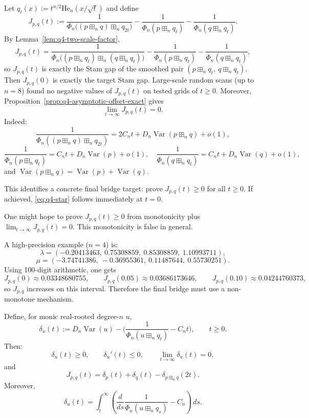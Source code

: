 \begin{remark}
Let $q_t(x):=t^{n/2}\mathrm{He}_n(x/\sqrt t)$ and define
\[
J_{p,q}(t):=
\frac1{\Phi_n\!\big((p\boxplus_n q)\boxplus_n q_{2t}\big)}
-\frac1{\Phi_n(p\boxplus_n q_t)}
-\frac1{\Phi_n(q\boxplus_n q_t)}.
\]
By Lemma~\ref{lem:q4-two-scale-factor},
\[
J_{p,q}(t)
=
\frac1{\Phi_n\!\big((p\boxplus_n q_t)\boxplus_n(q\boxplus_n q_t)\big)}
-\frac1{\Phi_n(p\boxplus_n q_t)}
-\frac1{\Phi_n(q\boxplus_n q_t)},
\]
so $J_{p,q}(t)$ is exactly the Stam gap of the smoothed pair
$(p\boxplus_n q_t,\ q\boxplus_n q_t)$.
Then $J_{p,q}(0)$ is exactly the target Stam gap.
Large-scale random scans (up to $n=8$) found no negative
values of $J_{p,q}(t)$ on tested grids of $t\ge 0$.
Moreover, Proposition~\ref{prop:q4-asymptotic-offset-exact} gives
\[
\lim_{t\to\infty}J_{p,q}(t)=0.
\]
Indeed:
\[
\frac1{\Phi_n((p\boxplus_n q)\boxplus_n q_{2t})}
=
2C_n t + D_n\operatorname{Var}(p\boxplus_n q)+o(1),
\]
\[
\frac1{\Phi_n(p\boxplus_n q_t)}
=
C_n t + D_n\operatorname{Var}(p)+o(1),
\quad
\frac1{\Phi_n(q\boxplus_n q_t)}
=
C_n t + D_n\operatorname{Var}(q)+o(1),
\]
and $\operatorname{Var}(p\boxplus_n q)=\operatorname{Var}(p)+\operatorname{Var}(q)$.

This identifies a concrete final bridge target:
prove $J_{p,q}(t)\ge 0$ for all $t\ge 0$.
If achieved, \eqref{eq:q4-star} follows immediately at $t=0$.
\end{remark}

\begin{remark}
One might hope to prove $J_{p,q}(t)\ge 0$ from monotonicity plus
$\lim_{t\to\infty}J_{p,q}(t)=0$. This monotonicity is false in general.

A high-precision example ($n=4$) is:
\[
\lambda=(-0.20413463,\ 0.75308859,\ 0.85308859,\ 1.10993711),
\]
\[
\mu=(-3.74741386,\ -0.36955361,\ 0.11487644,\ 0.55730251).
\]
Using 100-digit arithmetic, one gets
\[
J_{p,q}(0)\approx 0.03348680755,\qquad
J_{p,q}(0.05)\approx 0.03686173646,\qquad
J_{p,q}(0.10)\approx 0.04244760373,
\]
so $J_{p,q}$ increases on this interval.
Therefore the final bridge must use a non-monotone mechanism.
\end{remark}

\begin{proposition}\label{prop:q4-deficit-bridge}
Define, for monic real-rooted degree-$n$ $u$,
\[
\delta_u(t):=
D_n\operatorname{Var}(u)
-\Big(\frac1{\Phi_n(u\boxplus_n q_t)}-C_n t\Big),
\qquad t\ge 0.
\]
Then:
\[
\delta_u(t)\ge 0,\qquad \delta_u'(t)\le 0,\qquad \lim_{t\to\infty}\delta_u(t)=0,
\]
and
\[
J_{p,q}(t)=\delta_p(t)+\delta_q(t)-\delta_{p\boxplus_n q}(2t).
\]
Moreover,
\[
\delta_u(t)=\int_t^\infty
\left(
\frac{d}{ds}\frac1{\Phi_n(u\boxplus_n q_s)}-C_n
\right)\,ds.
\]
\end{proposition}

